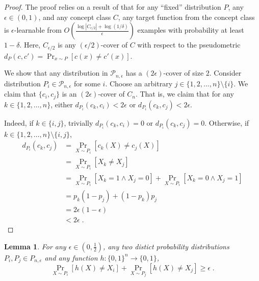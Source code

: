 \documentclass[12pt]{article}
\newtheorem{lemma}[proposition]{Lemma}
\renewcommand{\P}{\mathcal{P}}
\begin{document}
\begin{proof}
The proof relies on a result of \cite{Benedek-Itai-1991} that for any ``fixed''
distribution $P$, any $\epsilon \in (0,1)$, and any concept class $C$, any
target function from the concept class is $\epsilon$-learnable from $O \left(
\frac{\log |C_{\epsilon/2}| + \log (1/\delta)}{\epsilon}\right)$ examples with
probability at least $1-\delta$. Here, $C_{\epsilon/2}$ is any
$(\epsilon/2)$-cover of $C$ with respect to the pseudometric $d_P(c,c') = \Pr_{x
\sim P}[c(x) \neq c'(x)]$.

We show that any distribution in $\P_{n,\epsilon}$ has a $(2\epsilon)$-cover of
size $2$. Consider distribution $P_i \in \P_{n,\epsilon}$ for some $i$. Choose
an arbitrary $j \in \{1,2,\dots,n\} \setminus \{i\}$. We claim that $\{c_i,
c_j\}$ is an $(2\epsilon)$-cover of $C_n$. That is, we claim that for any $k \in
\{1,2,\dots,n\}$, either $d_{P_i}(c_k,c_i) < 2\epsilon$ or $d_{P_i}(c_k,c_j) <
2\epsilon$.

Indeed, if $k \in \{i,j\}$, trivially $d_{P_i}(c_k,c_i) = 0$ or $d_{P_i}(c_k,c_j) = 0$.
Otherwise, if  $k \in \{1,2,\dots,n\} \setminus \{i,j\}$,
\begin{align*}
d_{P_i}(c_k, c_j)
& = \Pr_{X \sim P_i}[c_k(X) \neq c_j(X)] \\
& = \Pr_{X \sim P_i}[X_k \neq X_j] \\
& = \Pr_{X \sim P_i}[X_k = 1 \wedge X_j = 0] + \Pr_{X \sim P_i}[X_k = 0 \wedge X_j = 1] \\
& = p_k(1 - p_j) + (1 - p_k) p_j \\
& = 2 \epsilon (1-\epsilon) \\
& < 2 \epsilon \; .
\end{align*}
\end{proof}

\begin{lemma}
\label{lemma:projection-distances}
For any $\epsilon \in (0,\frac{1}{2})$,
any two distict probability distributions $P_i,P_j \in P_{n,\epsilon}$
and any function $h:\{0,1\}^n \to \{0,1\}$,
$$
\Pr_{X \sim P_i}[h(X) \neq X_i] + \Pr_{X \sim P_j}[h(X) \neq X_j] \ge \epsilon \; .
$$
\end{lemma}
\end{document}
